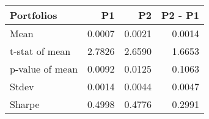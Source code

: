 \begin{tabular}{lrrr}
\toprule
Portfolios & P1 & P2 & P2 - P1 \\
\midrule
Mean & 0.0007 & 0.0021 & 0.0014 \\
t-stat of mean & 2.7826 & 2.6590 & 1.6653 \\
p-value of mean & 0.0092 & 0.0125 & 0.1063 \\
Stdev & 0.0014 & 0.0044 & 0.0047 \\
Sharpe & 0.4998 & 0.4776 & 0.2991 \\
\bottomrule
\end{tabular}
